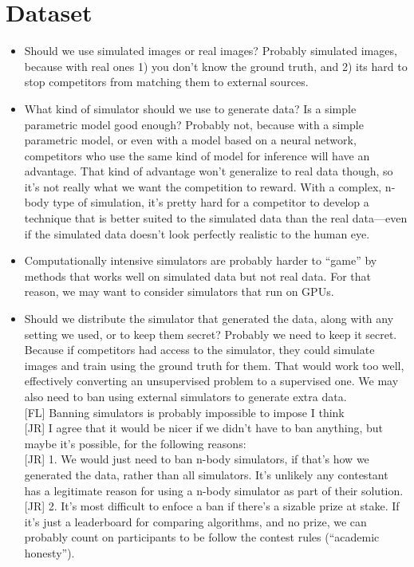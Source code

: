 \documentclass[10pt,letter]{article}
\newcommand{\fl}[1]{{\color{magenta}[FL] #1}}
\newcommand{\jr}[1]{{\color{blue}[JR] #1}}
\begin{document}
\section{Dataset}

\begin{itemize}
\item Should we use simulated images or real images? Probably simulated images, because with real ones 1) you don't know the ground truth, and 2) its hard to stop competitors from matching them to external sources. 
\item What kind of simulator should we use to generate data? Is a simple parametric model good enough? Probably not, because with a simple parametric model, or even with a model based on a neural network, competitors who use the same kind of model for inference will have an advantage. That kind of advantage won't generalize to real data though, so it's not really what we want the competition to reward. With a complex, n-body type of simulation, it's pretty hard for a competitor to develop a technique that is better suited to the simulated data than the real data---even if the simulated data doesn't look perfectly realistic to the human eye.
\item Computationally intensive simulators are probably harder to ``game'' by methods that works well on simulated data but not real data. For that reason, we may want to consider simulators that run on GPUs. 
\item Should we distribute the simulator that generated the data, along with any setting we used, or to keep them secret? Probably we need to keep it secret. Because if competitors had access to the simulator, they could simulate images and train using the ground truth for them. That would work too well, effectively converting an unsupervised problem to a supervised one. We may also need to ban using external simulators to generate extra data.\\
\fl{Banning simulators is probably impossible to impose I think}\\
\jr{I agree that it would be nicer if we didn't have to ban anything, but maybe it's possible, for the following reasons:}\\
\jr{1. We would just need to ban n-body simulators, if that's how we generated the data, rather than all simulators. It's unlikely any contestant has a legitimate reason for using a n-body simulator as part of their solution.}\\
\jr{2. It's most difficult to enfoce a ban if there's a sizable prize at stake. If it's just a leaderboard for comparing algorithms, and no prize, we can probably count on participants to be follow the contest rules (``academic honesty'').}\\

\end{itemize}
\end{document}
